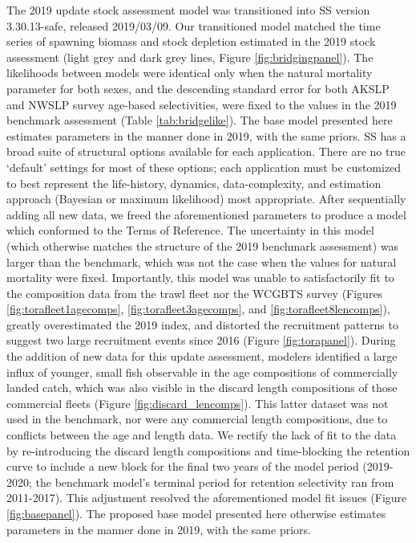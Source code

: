 \documentclass[11pt,
  english,
  a4paper,
]{article}
\begin{document}
\leavevmode\tagmcend\tagstructend


The 2019 update stock assessment model was transitioned into SS version 3.30.13-safe, released 2019/03/09. Our transitioned model matched the time series of spawning biomass and stock depletion estimated in the 2019 stock assessment (light grey and dark grey lines, Figure \ref{fig:bridgingpanel}). The likelihoods between models were identical only when the natural mortality parameter for both sexes, and the descending standard error for both AKSLP and NWSLP survey age-based selectivities, were fixed to the values in the 2019 benchmark assessment (Table \ref{tab:bridgelike}). The base model presented here estimates parameters in the manner done in 2019, with the same priors. SS has a broad suite of structural options available for each application. There are no true `default' settings for most of these options; each application must be customized to best represent the life-history, dynamics, data-complexity, and estimation approach (Bayesian or maximum likelihood) most appropriate. After sequentially adding all new data, we freed the aforementioned parameters to produce a model which conformed to the Terms of Reference. The uncertainty in this model (which otherwise matches the structure of the 2019 benchmark assessment) was larger than the benchmark, which was not the case when the values for natural mortality were fixed. Importantly, this model was unable to satisfactorily fit to the composition data from the trawl fleet nor the WCGBTS survey (Figures \ref{fig:torafleet1agecomps}, \ref{fig:torafleet3agecomps}, and \ref{fig:torafleet8lencomps}), greatly overestimated the 2019 index, and distorted the recruitment patterns to suggest two large recruitment events since 2016 (Figure \ref{fig:torapanel}). During the addition of new data for this update assessment, modelers identified a large influx of younger, small fish observable in the age compositions of commercially landed catch, which was also visible in the discard length compositions of those commercial fleets (Figure \ref{fig:discard_lencomps}). This latter dataset was not used in the benchmark, nor were any commercial length compositions, due to conflicts between the age and length data. We rectify the lack of fit to the data by re-introducing the discard length compositions and time-blocking the retention curve to include a new block for the final two years of the model period (2019-2020; the benchmark model's terminal period for retention selectivity ran from 2011-2017). This adjustment resolved the aforementioned model fit issues (Figure \ref{fig:basepanel}). The proposed base model presented here otherwise estimates parameters in the manner done in 2019, with the same priors.
\end{document}
